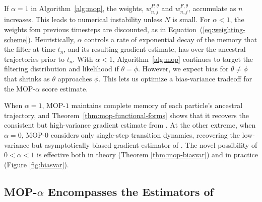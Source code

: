 \documentclass[11pt]{article}
\begin{document}




If $\alpha=1$ in Algorithm~\ref{alg:mop}, the weights, $w^{P,\theta}_{n,j}$ and $w^{F,\theta}_{n,j}$, accumulate as $n$ increases.
This leads to numerical instability unless $N$ is small.
For $\alpha<1$, the weights fom previous timesteps are discounted, as in Equation~(\ref{eq:weighting-scheme}).
Heuristically, $\alpha$ controls a rate of exponential decay of the memory that the filter at time $t_n$, and its resulting gradient estimate, has over the ancestral trajectories prior to $t_n$.
With $\alpha<1$, Algorithm~\ref{alg:mop} continues to target the filtering distribution and likelihood if $\theta=\phi$.
However, we expect bias for $\theta\neq\phi$ that shrinks as $\theta$ approaches $\phi$.
This lets us optimize a bias-variance tradeoff for the MOP-$\alpha$ score estimate.

When $\alpha=1$, MOP-$1$ maintains complete memory of each particle's ancestral trajectory, and Theorem~\ref{thm:mop-functional-forms} shows that it recovers the consistent but high-variance gradient estimate from \cite{poyiadjis11, scibior21}.
At the other extreme, when $\alpha=0$, MOP-$0$ considers only single-step transition dynamics, recovering the low-variance but asymptotically biased gradient estimator of \cite{naesseth18}. 
The novel possibility of $0<\alpha<1$ is effective both in theory (Theorem \ref{thm:mop-biasvar}) and in practice (Figure \ref{fig:biasvar}). 

\subsection{MOP-$\alpha$ Encompasses the Estimators of \cite{poyiadjis11, scibior21, naesseth18}}
\end{document}
